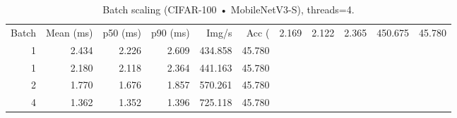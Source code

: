 \begin{table}
\caption{Batch scaling (CIFAR-100 • MobileNetV3-S), threads=4.}
\label{tab:batch_cifar100_mobilenet_v3_small}
\begin{tabular}{rrrrrr}
\toprule
Batch & Mean (ms) & p50 (ms) & p90 (ms) & Img/s & Acc (%
 & 2.169 & 2.122 & 2.365 & 450.675 & 45.780 \\
1 & 2.434 & 2.226 & 2.609 & 434.858 & 45.780 \\
1 & 2.180 & 2.118 & 2.364 & 441.163 & 45.780 \\
2 & 1.770 & 1.676 & 1.857 & 570.261 & 45.780 \\
4 & 1.362 & 1.352 & 1.396 & 725.118 & 45.780 \\
\bottomrule
\end{tabular}
\end{table}
